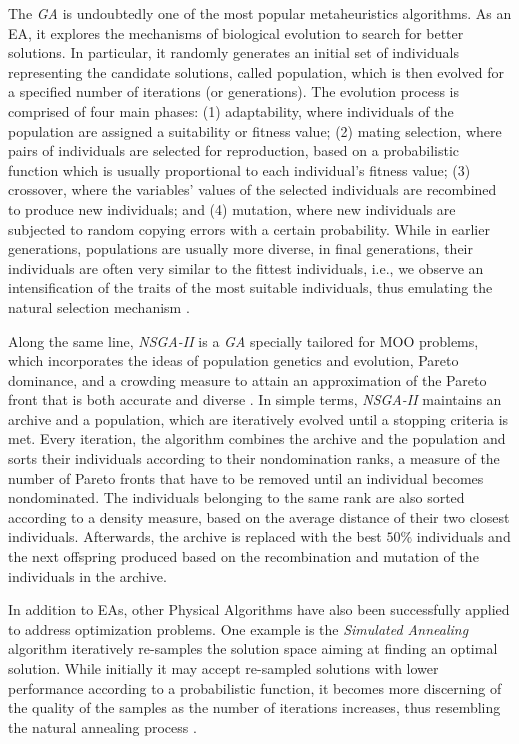 The \textit{\ac{GA}} is undoubtedly one of the most popular metaheuristics algorithms. As an \ac{EA}, it explores the mechanisms of biological evolution to search for better solutions. In particular, it randomly generates an initial set of individuals representing the candidate solutions, called population, which is then evolved for a specified number of iterations (or generations). The evolution process is comprised of four main phases: (1) adaptability, where individuals of the population are assigned a suitability or fitness value; (2) mating selection, where pairs of individuals are selected for reproduction, based on a probabilistic function which is usually proportional to each individual's fitness value; (3) crossover, where the variables' values of the selected individuals are recombined to produce new individuals; and (4) mutation, where new individuals are subjected to random copying errors with a certain probability. While in earlier generations, populations are usually more diverse, in final generations, their individuals are often very similar to the fittest individuals, i.e., we observe an intensification of the traits of the most suitable individuals, thus emulating the natural selection mechanism \cite{Glover2003Metaheuristics}.

Along the same line, \textit{\ac{NSGA-II}} is a \textit{\ac{GA}} specially tailored for \ac{MOO} problems, which incorporates the ideas of population genetics and evolution, Pareto dominance, and a crowding measure to attain an approximation of the Pareto front that is both accurate and diverse \cite{Deb2002}. In simple terms, \textit{\ac{NSGA-II}} maintains an archive and a population, which are iteratively evolved until a stopping criteria is met. Every iteration, the algorithm combines the archive and the population and sorts their individuals according to their nondomination ranks, a measure of the number of Pareto fronts that have to be removed until an individual becomes nondominated. The individuals belonging to the same rank are also sorted according to a density measure, based on the average distance of their two closest individuals. Afterwards, the archive is replaced with the best $50\%$ individuals and the next offspring produced based on the recombination and mutation of the individuals in the archive.

In addition to \acp{EA}, other Physical Algorithms have also been successfully applied to address optimization problems. One example is the \textit{Simulated Annealing} algorithm  iteratively re-samples the solution space aiming at finding an optimal solution. While initially it may accept re-sampled solutions with lower performance according to a probabilistic function, it becomes more discerning of the quality of the samples as the number of iterations increases, thus resembling the natural annealing process \cite{Glover2003Metaheuristics}.

